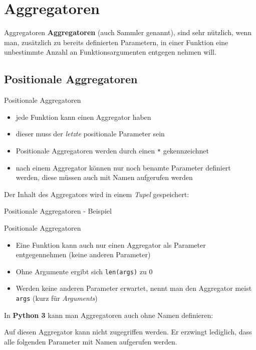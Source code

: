 \section{Aggregatoren}
\begin{frame}{Aggregatoren}
  \textbf{Aggregatoren} (auch Sammler genannt), sind sehr n\"utzlich, wenn man,
  zus\"atzlich zu bereits definierten Parametern, in einer Funktion eine unbestimmte
  Anzahl an Funktionsargumenten entgegen nehmen will.
\end{frame}


\subsection{Positionale Aggregatoren}
\begin{frame}[fragile]{Positionale Aggregatoren}
  \begin{itemize}
    \item jede Funktion kann einen Aggregator haben
    \item dieser muss der \textit{letzte} positionale Parameter sein
    \item Positionale Aggregatoren werden durch einen \texttt{*} gekennzeichnet
    \item nach einem Aggregator k\"onnen nur noch benamte Parameter definiert werden,
    diese m\"ussen auch mit Namen aufgerufen werden \\[.5cm]
  \end{itemize}
  Der Inhalt des Aggregators wird in einem \textit{Tupel} gespeichert:
  
\end{frame}

\begin{frame}{Positionale Aggregatoren - Beispiel}
  
\end{frame}

\begin{frame}[fragile]{Positionale Aggregatoren}
  \begin{itemize}
    \item Eine Funktion kann auch nur einen Aggregator als Parameter entgegennehmen (keine anderen Parameter)
    \item Ohne Argumente ergibt sich \texttt{len(args)} zu 0
    \item Werden keine anderen Parameter erwartet, nennt man den Aggregator meist
    \texttt{args} (kurz für \textit{Arguments}) \\[.75cm]
  \end{itemize}
  In \textbf{Python 3} kann man Aggregatoren auch ohne Namen definieren:
  
  Auf diesen Aggregator kann nicht zugegriffen werden. Er erzwingt lediglich, dass
  alle folgenden Parameter mit Namen aufgerufen werden.
\end{frame}


